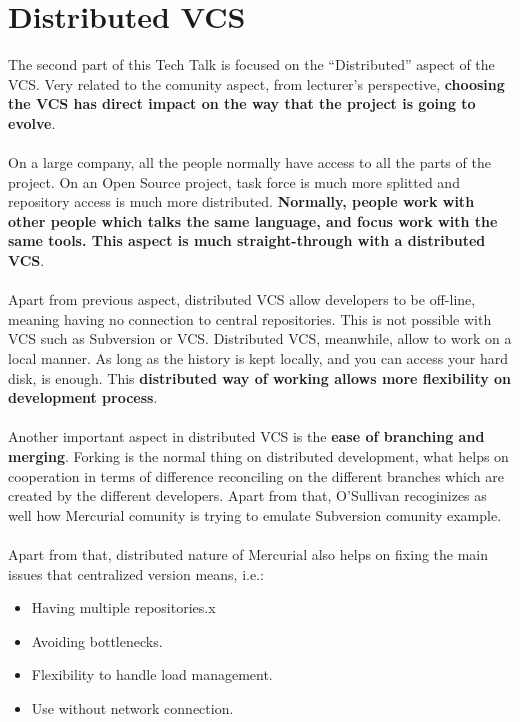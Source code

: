 \documentclass[11pt]{article}
\begin{document}
\section{Distributed VCS}
The second part of this Tech Talk is focused on the ``Distributed'' aspect of the VCS. Very related to the comunity aspect, from lecturer's perspective, \textbf{choosing the VCS has direct impact on the way that the project is going to evolve}.\\
\\
On a large company, all the people normally have access to all the parts of the project. On an Open Source project, task force is much more splitted and repository access is much more distributed. \textbf{Normally, people work with other people which talks the same language, and focus work with the same tools. This aspect is much straight-through with a distributed VCS}.\\
\\
Apart from previous aspect, distributed VCS allow developers to be off-line, meaning having no connection to central repositories. This is not possible with VCS such as Subversion or VCS. Distributed VCS, meanwhile, allow to work on a local manner. As long as the history is kept locally, and you can access your hard disk, is enough. This \textbf{distributed way of working allows more flexibility on development process}.\\
\\
Another important aspect in distributed VCS is the \textbf{ease of branching and merging}. Forking is the normal thing on distributed development, what helps on cooperation in terms of difference reconciling on the different branches which are created by the different developers. Apart from that, O'Sullivan recoginizes as well how Mercurial comunity is trying to emulate Subversion comunity example.\\
\\
Apart from that, distributed nature of Mercurial also helps on fixing the main issues that centralized version means, i.e.:
\begin{itemize}\itemsep0pt
\item{Having multiple repositories}.x
\item{Avoiding bottlenecks}.
\item{Flexibility to handle load management}.
\item{Use without network connection}.
\end{itemize}
\end{document}
